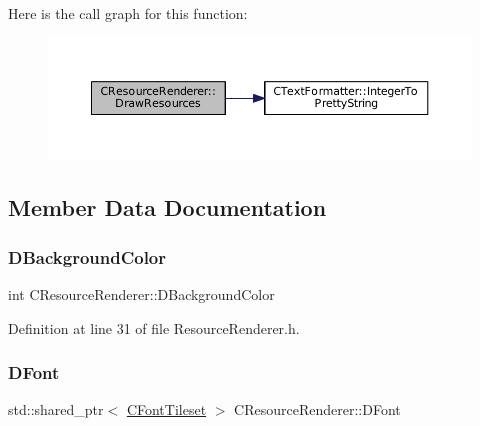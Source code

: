 Here is the call graph for this function\+:\nopagebreak
\begin{figure}[H]
\begin{center}
\leavevmode
\includegraphics[width=350pt]{classCResourceRenderer_ad10676ab10fe217aebbc3dca68d745b0_cgraph}
\end{center}
\end{figure}


\subsection{Member Data Documentation}
\hypertarget{classCResourceRenderer_a7985a8b9266542c506acc20b12e23ebb}{}\label{classCResourceRenderer_a7985a8b9266542c506acc20b12e23ebb} 
\subsubsection{\texorpdfstring{D\+Background\+Color}{DBackgroundColor}}
{\footnotesize\ttfamily int C\+Resource\+Renderer\+::\+D\+Background\+Color\hspace{0.3cm}{\ttfamily [protected]}}



Definition at line 31 of file Resource\+Renderer.\+h.

\hypertarget{classCResourceRenderer_acd1383d226622757afdcdcf6d9747aa0}{}\label{classCResourceRenderer_acd1383d226622757afdcdcf6d9747aa0} 
\subsubsection{\texorpdfstring{D\+Font}{DFont}}
{\footnotesize\ttfamily std\+::shared\+\_\+ptr$<$ \hyperlink{classCFontTileset}{C\+Font\+Tileset} $>$ C\+Resource\+Renderer\+::\+D\+Font\hspace{0.3cm}{\ttfamily [protected]}}



